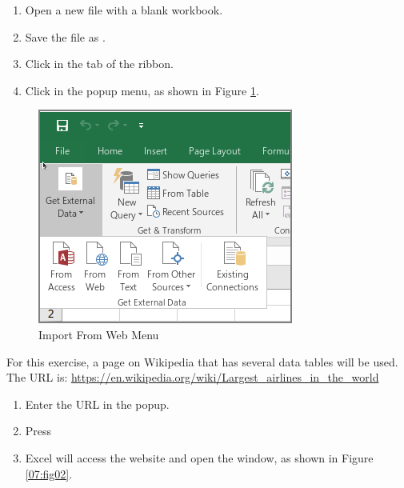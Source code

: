 \begin{enumerate}
	\item Open a new file with a blank workbook.
	\item Save the file as .
	\item Click  in the  tab of the ribbon.
	\item Click  in the popup menu, as shown in Figure \ref{07:fig01}.
\end{enumerate}

\begin{figure}[H]
	\centering
	\includegraphics[width=\maxwidth{.95\linewidth}]{gfx/ch07_fig01}
	\caption{Import From Web Menu}
	\label{07:fig01}
\end{figure}

For this exercise, a page on Wikipedia that has several data tables will be used. The URL is: \url{https://en.wikipedia.org/wiki/Largest_airlines_in_the_world}

\begin{enumerate}[resume]
	\item Enter the URL in the  popup.
	\item Press 
	\item Excel will access the website and open the  window, as shown in Figure \ref{07:fig02}.
\end{enumerate}

